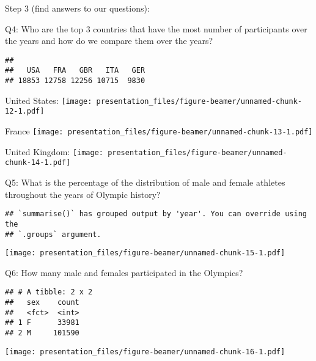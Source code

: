 \documentclass[
  ignorenonframetext,
]{beamer}
\begin{document}
\begin{frame}[fragile]{Step 3 (find answers to our questions):}
\begin{block}{Q4: Who are the top 3 countries that have the most number
of participants over the years and how do we compare them over the
years?}
\protect\hypertarget{q4-who-are-the-top-3-countries-that-have-the-most-number-of-participants-over-the-years-and-how-do-we-compare-them-over-the-years}{}
\begin{verbatim}
## 
##   USA   FRA   GBR   ITA   GER 
## 18853 12758 12256 10715  9830
\end{verbatim}

\begin{block}{United States:}
\protect\hypertarget{united-states}{}
\texttt{[image: presentation\_files/figure-beamer/unnamed-chunk-12-1.pdf]}
\end{block}

\begin{block}{France}
\protect\hypertarget{france}{}
\texttt{[image: presentation\_files/figure-beamer/unnamed-chunk-13-1.pdf]}
\end{block}

\begin{block}{United Kingdom:}
\protect\hypertarget{united-kingdom}{}
\texttt{[image: presentation\_files/figure-beamer/unnamed-chunk-14-1.pdf]}
\end{block}
\end{block}

\begin{block}{Q5: What is the percentage of the distribution of male and
female athletes throughout the years of Olympic history?}
\protect\hypertarget{q5-what-is-the-percentage-of-the-distribution-of-male-and-female-athletes-throughout-the-years-of-olympic-history}{}
\begin{verbatim}
## `summarise()` has grouped output by 'year'. You can override using the
## `.groups` argument.
\end{verbatim}

\texttt{[image: presentation\_files/figure-beamer/unnamed-chunk-15-1.pdf]}
\end{block}

\begin{block}{Q6: How many male and females participated in the
Olympics?}
\protect\hypertarget{q6-how-many-male-and-females-participated-in-the-olympics}{}
\begin{verbatim}
## # A tibble: 2 x 2
##   sex    count
##   <fct>  <int>
## 1 F      33981
## 2 M     101590
\end{verbatim}

\texttt{[image: presentation\_files/figure-beamer/unnamed-chunk-16-1.pdf]}
\end{block}


\end{frame}
\end{document}
